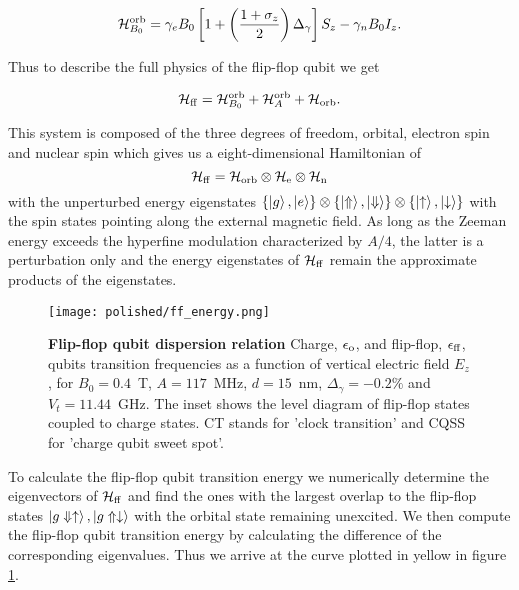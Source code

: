 \begin{equation} \label{eq:H_Zeeman_orb}
\mathcal{H}_{B_0}^{\rm orb}=\gamma_e B_0\left[1+\left(\frac{1+\sigma_z}{2}\right)\Delta_\gamma\right]S_z - \gamma_n B_0 I_z.
\end{equation}

Thus to describe the full physics of the flip-flop qubit we get

\begin{equation} \label{eq:H_ff_ge}
\mathcal{H}_{\rm ff} = \mathcal{H}_{B_0}^{\rm orb} +\mathcal{H}_{A}^{\rm orb} + \mathcal{H}_{\rm orb}.
\end{equation}

This system is composed of the three degrees of freedom, orbital, electron spin and nuclear spin which gives us a eight-dimensional Hamiltonian of
\begin{equation}
\mathcal{H}_{\rm{ff}}=\mathcal{H}_{\rm{orb}}\otimes \mathcal{H}_{\rm{e}}\otimes \mathcal{H}_{\rm{n}}
\end{equation}
with the unperturbed energy eigenstates $\{\ket{g}, \ket{e}\} \otimes \{\ket{\Uparrow}, \ket{\Downarrow}\} \otimes  \{\ket{\uparrow}, \ket{\downarrow}\}$ with the spin states pointing along the external magnetic field. 
As long as the Zeeman energy exceeds the hyperfine modulation characterized by $A/4$, the latter is a perturbation only and the energy eigenstates of $\mathcal{H}_{\rm{ff}}$ remain the approximate products of the eigenstates. 

\begin{figure}[h]
	\centering
	\texttt{[image: polished/ff\_energy.png]}
	\caption[Flip-flop qubit dispersion relation]{\textbf{Flip-flop qubit dispersion relation} Charge, $\epsilon_{\rm o}$, and flip-flop, $\epsilon_{\rm ff}$, qubits transition frequencies as a function of vertical electric field $E_z$, for $B_0=0.4$~T, $A=117$~MHz, $d=15$~nm, $\Delta_\gamma=-0.2\%$ and $V_t=11.44$~GHz. The inset shows the level diagram of flip-flop states coupled to charge states. CT stands for 'clock transition' and CQSS for 'charge qubit sweet spot'.}
	\label{fig:ff_energy}
\end{figure}

To calculate the flip-flop qubit transition energy we numerically determine the eigenvectors of $\mathcal{H}_{\rm{ff}}$ and find the ones with the largest overlap to the flip-flop states $\ket{g \Downarrow \uparrow}, \ket{g\Uparrow\downarrow}$ with the orbital state remaining unexcited. We then  compute the flip-flop qubit transition energy by calculating the difference of the corresponding eigenvalues. Thus we arrive at the curve plotted in yellow in figure \ref{fig:ff_energy}.

